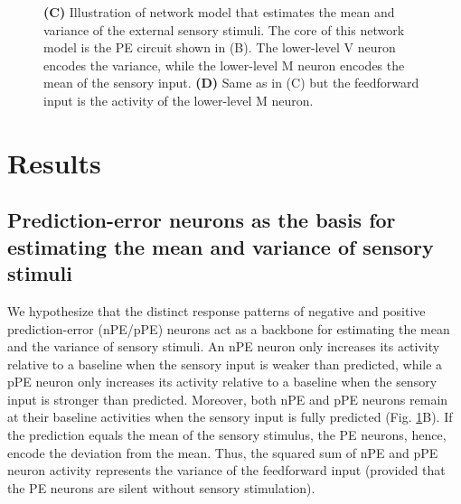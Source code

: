 \documentclass[10pt,a4paper]{article}
\providecommand{\DIFaddendFL}{} %
\DeclareRobustCommand{\DIFaddendFL}{\DIFOaddendFL \let\includegraphics\DIFOincludegraphics} %
\begin{document}
\begin{figure}[t!]
{{}\DIFaddendFL {\bf (C)} Illustration of network model that estimates the mean and variance of the external sensory stimuli. The core of this network model is the PE circuit shown in (B). The lower-level V neuron encodes the variance, while the lower-level M neuron encodes the mean of the sensory input.
{\bf (D)} Same as in (C) but the feedforward input is the activity of the lower-level M neuron.
}
\label{fig:Fig_1}
\end{figure}
%


\section*{Results}
%

\subsection*{Prediction-error neurons as the basis for estimating the mean and variance of sensory stimuli}
%
We hypothesize that the distinct response patterns of negative and positive prediction-error (nPE/pPE) neurons act as a backbone for estimating the mean and the variance of sensory stimuli. An nPE neuron only increases its activity relative to a baseline when the sensory input is weaker than predicted, while a pPE neuron only increases its activity relative to a baseline when the sensory input is stronger than predicted. Moreover, both nPE and pPE neurons remain at their baseline activities when the sensory input is fully predicted (Fig. \ref{fig:Fig_1}B). If the prediction equals the mean of the sensory stimulus, the PE neurons, hence, encode the deviation from the mean. Thus, the squared sum of nPE and pPE neuron activity represents the variance of the feedforward input (provided that the PE neurons are silent without sensory stimulation).
%
\end{document}
